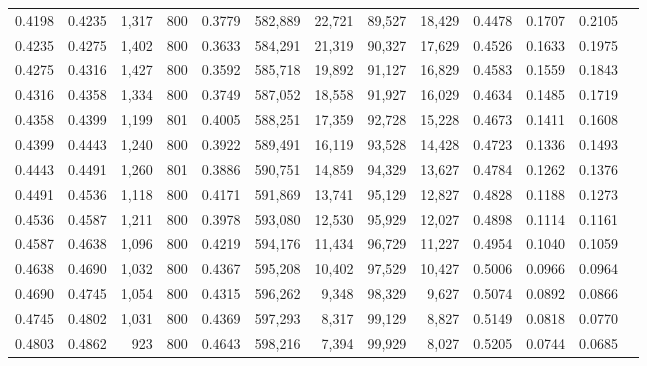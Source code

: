 \begin{tabular}{rrrrrrrrrrrrr}
0.4198 & 0.4235 &  1,317 &   800 &                                     0.3779 & 582,889 &  22,721 &  89,527 &  18,429 & 0.4478 & 0.1707 & 0.2105 \\
0.4235 & 0.4275 &  1,402 &   800 &                                     0.3633 & 584,291 &  21,319 &  90,327 &  17,629 & 0.4526 & 0.1633 & 0.1975 \\
0.4275 & 0.4316 &  1,427 &   800 &                                     0.3592 & 585,718 &  19,892 &  91,127 &  16,829 & 0.4583 & 0.1559 & 0.1843 \\
0.4316 & 0.4358 &  1,334 &   800 &                                     0.3749 & 587,052 &  18,558 &  91,927 &  16,029 & 0.4634 & 0.1485 & 0.1719 \\
0.4358 & 0.4399 &  1,199 &   801 &                                     0.4005 & 588,251 &  17,359 &  92,728 &  15,228 & 0.4673 & 0.1411 & 0.1608 \\
0.4399 & 0.4443 &  1,240 &   800 &                                     0.3922 & 589,491 &  16,119 &  93,528 &  14,428 & 0.4723 & 0.1336 & 0.1493 \\
0.4443 & 0.4491 &  1,260 &   801 &                                     0.3886 & 590,751 &  14,859 &  94,329 &  13,627 & 0.4784 & 0.1262 & 0.1376 \\
0.4491 & 0.4536 &  1,118 &   800 &                                     0.4171 & 591,869 &  13,741 &  95,129 &  12,827 & 0.4828 & 0.1188 & 0.1273 \\
0.4536 & 0.4587 &  1,211 &   800 &                                     0.3978 & 593,080 &  12,530 &  95,929 &  12,027 & 0.4898 & 0.1114 & 0.1161 \\
0.4587 & 0.4638 &  1,096 &   800 &                                     0.4219 & 594,176 &  11,434 &  96,729 &  11,227 & 0.4954 & 0.1040 & 0.1059 \\
0.4638 & 0.4690 &  1,032 &   800 &                                     0.4367 & 595,208 &  10,402 &  97,529 &  10,427 & 0.5006 & 0.0966 & 0.0964 \\
0.4690 & 0.4745 &  1,054 &   800 &                                     0.4315 & 596,262 &   9,348 &  98,329 &   9,627 & 0.5074 & 0.0892 & 0.0866 \\
0.4745 & 0.4802 &  1,031 &   800 &                                     0.4369 & 597,293 &   8,317 &  99,129 &   8,827 & 0.5149 & 0.0818 & 0.0770 \\
0.4803 & 0.4862 &    923 &   800 &                                     0.4643 & 598,216 &   7,394 &  99,929 &   8,027 & 0.5205 & 0.0744 & 0.0685 \\

\end{tabular}
